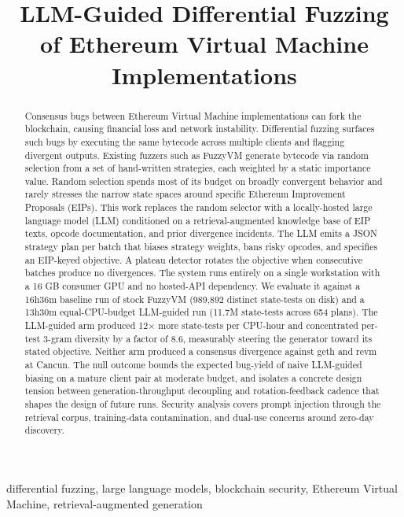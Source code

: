 \documentclass[conference]{IEEEtran}
\title{LLM-Guided Differential Fuzzing of Ethereum Virtual Machine Implementations}
\author{
\IEEEauthorblockN{Aidan Morgan}
\IEEEauthorblockA{Department of Computing Security\\
Rochester Institute of Technology\\
Rochester, NY, USA}
\and
\IEEEauthorblockN{Odessa Rybski}
\IEEEauthorblockA{Department of Computing Security\\
Rochester Institute of Technology\\
Rochester, NY, USA}
}
\begin{document}
\maketitle

\begin{abstract}
Consensus bugs between Ethereum Virtual Machine implementations can fork the blockchain, causing financial loss and network instability. Differential fuzzing surfaces such bugs by executing the same bytecode across multiple clients and flagging divergent outputs. Existing fuzzers such as FuzzyVM generate bytecode via random selection from a set of hand-written strategies, each weighted by a static importance value. Random selection spends most of its budget on broadly convergent behavior and rarely stresses the narrow state spaces around specific Ethereum Improvement Proposals (EIPs). This work replaces the random selector with a locally-hosted large language model (LLM) conditioned on a retrieval-augmented knowledge base of EIP texts, opcode documentation, and prior divergence incidents. The LLM emits a JSON strategy plan per batch that biases strategy weights, bans risky opcodes, and specifies an EIP-keyed objective. A plateau detector rotates the objective when consecutive batches produce no divergences. The system runs entirely on a single workstation with a 16 GB consumer GPU and no hosted-API dependency. We evaluate it against a 16h36m baseline run of stock FuzzyVM (989,892 distinct state-tests on disk) and a 13h30m equal-CPU-budget LLM-guided run (11.7M state-tests across 654 plans). The LLM-guided arm produced 12$\times$ more state-tests per CPU-hour and concentrated per-test 3-gram diversity by a factor of 8.6, measurably steering the generator toward its stated objective. Neither arm produced a consensus divergence against geth and revm at Cancun. The null outcome bounds the expected bug-yield of naive LLM-guided biasing on a mature client pair at moderate budget, and isolates a concrete design tension between generation-throughput decoupling and rotation-feedback cadence that shapes the design of future runs. Security analysis covers prompt injection through the retrieval corpus, training-data contamination, and dual-use concerns around zero-day discovery.
\end{abstract}

\begin{IEEEkeywords}
differential fuzzing, large language models, blockchain security, Ethereum Virtual Machine, retrieval-augmented generation
\end{IEEEkeywords}
\end{document}
